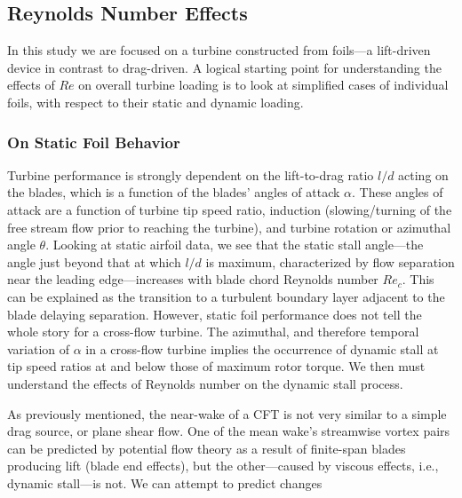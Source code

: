 \documentclass[energies,article,accept,moreauthors,pdftex,12pt,a4paper]{mdpi}
\begin{document}

\subsection{Reynolds Number Effects}

In this study we are focused on a turbine constructed from foils---a lift-driven
device in contrast to drag-driven. A logical starting point for understanding
the effects of $Re$ on overall turbine loading is to look at simplified cases
of individual foils, with respect to their static and dynamic loading. 

\subsubsection{On Static Foil Behavior}

Turbine performance is strongly dependent on the lift-to-drag ratio $l/d$ acting
on the blades, which is a function of the blades' angles of attack $\alpha$.
These angles of attack are a function of turbine tip speed ratio, induction
(slowing/turning of the free stream flow prior to reaching the turbine), and
turbine rotation or azimuthal angle $\theta$. Looking at static airfoil data, we
see that the static stall angle---the angle just beyond that at which $l/d$ is
maximum, characterized by flow separation near the leading edge---increases with
blade chord Reynolds number $Re_c$. This can be explained as the transition to a
turbulent boundary layer adjacent to the blade delaying separation. However,
static foil performance does not tell the whole story for a cross-flow turbine.
The azimuthal, and therefore temporal variation of $\alpha$ in a cross-flow
turbine implies the occurrence of dynamic stall at tip speed ratios at and below
those of maximum rotor torque\cite{Para2002}. We then must understand the
effects of Reynolds number on the dynamic stall process.

As previously mentioned, the near-wake of a CFT is not very similar to a simple
drag source, or plane shear flow. One of the mean wake's streamwise vortex pairs
can be predicted by potential flow theory as a result of finite-span blades
producing lift (blade end effects), but the other---caused by viscous effects,
i.e., dynamic stall---is not. We can attempt to predict changes
\end{document}
